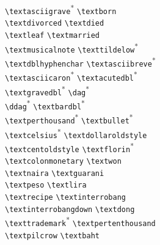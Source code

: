 {\begin{tabbing}
\textasciigrave \> \lstinline+\textasciigrave+\textsuperscript{*}  \> \textborn \> \lstinline+\textborn+\\
\textdivorced \> \lstinline+\textdivorced+ \> \textdied \> \lstinline+\textdied+\\
\textleaf \> \lstinline+\textleaf+ \> \textmarried \> \lstinline+\textmarried+\\
\textmusicalnote \> \lstinline+\textmusicalnote+ \> \texttildelow \> \lstinline+\texttildelow+\textsuperscript{*} \\
\textdblhyphenchar \> \lstinline+\textdblhyphenchar+ \> \textasciibreve \> \lstinline+\textasciibreve+\textsuperscript{*} \\
\textasciicaron \> \lstinline+\textasciicaron+\textsuperscript{*}  \> \textacutedbl \> \lstinline+\textacutedbl+\textsuperscript{*} \\
\textgravedbl \> \lstinline+\textgravedbl+\textsuperscript{*}  \> \textdagger \> \lstinline+\dag+\textsuperscript{*} \\
\textdaggerdbl \> \lstinline+\ddag+\textsuperscript{*} \> \textbardbl \> \lstinline+\textbardbl+\textsuperscript{*} \\
\textperthousand \> \lstinline+\textperthousand+\textsuperscript{*} \> \textbullet \> \lstinline+\textbullet+\textsuperscript{*} \\
\textcelsius \> \lstinline+\textcelsius+\textsuperscript{*}  \> \textdollaroldstyle \> \lstinline+\textdollaroldstyle+\\
\textcentoldstyle \> \lstinline+\textcentoldstyle+ \> \textflorin \> \lstinline+\textflorin+\textsuperscript{*} \\
\textcolonmonetary \> \lstinline+\textcolonmonetary+ \> \textwon \> \lstinline+\textwon+\\
\textnaira \> \lstinline+\textnaira+ \> \textguarani \> \lstinline+\textguarani+\\
\textpeso \> \lstinline+\textpeso+ \> \textlira \> \lstinline+\textlira+\\
\textrecipe \> \lstinline+\textrecipe+ \> \textinterrobang \> \lstinline+\textinterrobang+\\
\textinterrobangdown \> \lstinline+\textinterrobangdown+ \> \textdong \> \lstinline+\textdong+\\
\texttrademark \> \lstinline+\texttrademark+\textsuperscript{*} \> \textpertenthousand \> \lstinline+\textpertenthousand+\\
\textpilcrow \> \lstinline+\textpilcrow+ \> \textbaht \> \lstinline+\textbaht+\\

\end{tabbing}}
